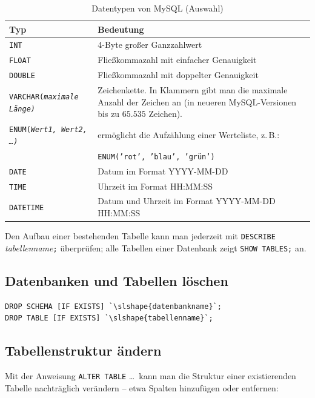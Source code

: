 \begin{table}[h]
\centering
\begin{tabular}{|l|p{11cm}|}
\hline
{\bfseries Typ} & {\bfseries Bedeutung}\\
\hline
\texttt{INT} & 4-Byte großer Ganzzahlwert\\
\hline
\texttt{FLOAT} & Fließkommazahl mit einfacher Genauigkeit\\
\hline
\texttt{DOUBLE} & Fließkommazahl mit doppelter Genauigkeit\\
\hline
\texttt{VARCHAR(\slshape{maximale Länge})} &
Zeichenkette. In Klammern gibt man die maximale Anzahl der Zeichen an (in
neueren MySQL-Versionen bis zu $65.535$ Zeichen).\\
\hline
\texttt{ENUM(\slshape{Wert1, Wert2, \ldots})}
& ermöglicht die Aufzählung einer Werteliste, z.\,B.:\\
& \texttt{ENUM('rot', 'blau', 'grün')}\\
\hline
\texttt{DATE} & Datum im Format YYYY-MM-DD\\
\hline
\texttt{TIME} & Uhrzeit im Format HH:MM:SS\\
\hline
\texttt{DATETIME} & Datum und Uhrzeit im Format YYYY-MM-DD HH:MM:SS\\
\hline
\end{tabular}
\caption{Datentypen von MySQL (Auswahl)}
\label{tab:mysql-datentypen}
\end{table}

Den Aufbau einer bestehenden Tabelle kann man jederzeit mit
\lstinline|DESCRIBE| \textit{tabellenname}\lstinline|;| überprüfen; alle Tabellen einer
Datenbank zeigt \lstinline|SHOW TABLES;| an.


\subsection{Datenbanken und Tabellen löschen}

\begin{lstlisting}
DROP SCHEMA [IF EXISTS] `\slshape{datenbankname}`;
DROP TABLE [IF EXISTS] `\slshape{tabellenname}`;
\end{lstlisting}


\subsection{Tabellenstruktur ändern}

Mit der Anweisung \lstinline|ALTER TABLE| \ldots\ kann man die Struktur einer
existierenden Tabelle nachträglich verändern -- etwa Spalten hinzufügen oder
entfernen:

